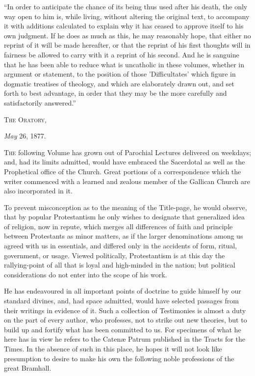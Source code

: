 ``In order to anticipate the chance of its being thus used
after his death, the only way open to him is, while living, without
altering the original text, to accompany it with additions calculated
to explain why it has ceased to approve itself to his own judgment. If
he does as much as this, he may reasonably hope, that either no
reprint of it will be made hereafter, or that the reprint of his first
thoughts will in fairness be allowed to carry with it a reprint of his
second. And he is sanguine that he has been able to reduce what is
uncatholic in these volumes, whether in argument or statement, to the
position of those 'Difficultates' which figure in dogmatic treatises
of theology, and which are elaborately drawn out, and set forth to
best advantage, in order that they may be the more carefully and
satisfactorily answered.''


T\textsc{he} O\textsc{ratory},

\emph{May} 26, 1877.








T\textsc{he} following Volume has grown out of Parochial Lectures
delivered on weekdays; and, had its limits admitted, would have
embraced the Sacerdotal as well as the Prophetical office of the
Church. Great portions of a correspondence which the writer commenced
with a learned and zealous member of the Gallican Church are also
incorporated in it.


To prevent misconception as to the meaning of the Title-page, he
would observe, that by popular Protestantism he only wishes to
designate that generalized idea of religion, now in repute, which
merges all differences of faith and principle between Protestants as
minor matters, as if the larger denominations among us agreed with us
in essentials, and differed only in the accidents of form, ritual,
government, or usage. Viewed politically, Protestantism is at this day
the rallying-point of all that is loyal and high-minded in the nation;
but political considerations do not enter into the scope of his work.


He has endeavoured in all important points of doctrine to guide
himself by our standard divines, and, had space admitted, would have
selected passages from their writings in evidence of it. Such a
collection of Testimonies is almost a duty on the part of every
author, who professes, not to strike out new theories, but to build up
and fortify what has been committed to us. For specimens of what he
here has in view he refers to the Catenæ Patrum published in the
Tracts for the Times. In the absence of such in this place, he hopes
it will not look like presumption to desire to make his own the
following noble professions of the great Bramhall.


